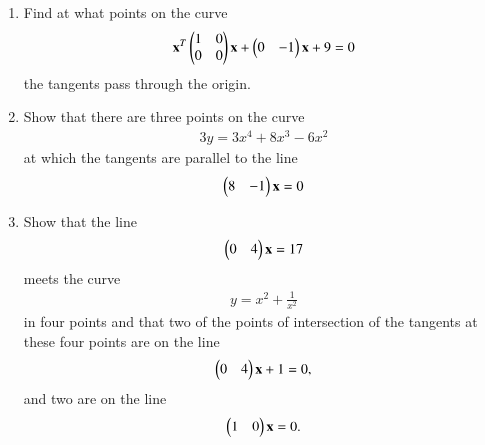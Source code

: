 \begin{enumerate}[label=\arabic*.,ref=\thesubsection.\theenumi]
\renewcommand{\theequation}{\theenumi}
\item Find at what points on the curve 
\begin{align}
\mathbf{x}^T\begin{pmatrix}1 & 0 \\ 0 & 0\end{pmatrix}\mathbf{x}+\begin{pmatrix}0 & -1\end{pmatrix}\mathbf{x}+9 = 0
\end{align}
 the tangents pass through the origin.
\item Show that there are three points on the curve
\begin{align}
3y=3x^4+8x^3-6x^2
\end{align}
at which the tangents are parallel to the line 
\begin{align}
\begin{pmatrix}8 & -1\end{pmatrix}\mathbf{x} = 0
\end{align}
\item Show that the  line 
\begin{align}
\begin{pmatrix}0 & 4\end{pmatrix}\mathbf{x}=17
\end{align}
meets the curve 
\begin{align}
y = x^2+\frac{1}{x^2}
\end{align}
in four points and that two of the points of intersection of the tangents at these
four points are on the line  
\begin{align}
\begin{pmatrix}0 & 4\end{pmatrix}\mathbf{x}+1=0, 
\end{align}
and two are on the line 
\begin{align}
\begin{pmatrix}1 & 0\end{pmatrix}\mathbf{x}=0.
\end{align}
\end{enumerate}
